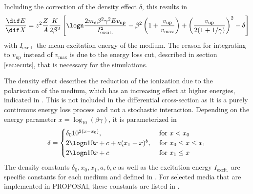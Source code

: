 Including the correction of the density effect $\delta$, this results in
\begin{align}
\frac{\dif E}{\dif X} = z^2 \frac{Z}{A} \frac{K}{2\beta^2}
    \left[
        \logn \frac{2 m_e \beta^2 \gamma^2 Ev_{\text{up}}}{I_{\text{excit.}}^2}
        - \beta^2 \left( 1 + \frac{v_{\text{up}}}{v_{\text{max}}} \right)
        + \left( \frac{v_\text{up}}{2(1 + 1/\gamma)} \right)^2
        - \delta
    \right]
\end{align}
with $I_{\text{excit.}}$ the mean excitation energy of the medium.
The reason for integrating to $v_{\text{up}}$ instead of $v_{\text{max}}$ is due to the energy loss cut, described in section \ref{sec:ecuts}, that is necessary for the simulations.

The density effect describes the reduction of the ionization due to the polarisation of the medium, which has an increasing effect at higher energies, indicated in .
This is not included in the differential cross-section as it is a purely continuous energy loss process and not a stochastic interaction.
Depending on the energy parameter $x = \log_{10}(\beta\gamma)$, it is parameterized in \cite{Sternheimer52}
\begin{align}
\delta =
    \begin{cases}
        \delta_0 10^{2(x - x_0)}, & \text{ for } x < x_0\\
        2 \logn 10 x + c + a(x_1 - x)^b, & \text{ for } x_0 \leq x \leq x_1 \\
        2 \logn 10 x + c & \text{ for } x_1 \leq x
    \end{cases}
\end{align}
The density constants $\delta_0, x_0, x_1, a, b, c$ as well as the excitation energy $I_{\text{excit.}}$ are specific constants for each medium and defined in \cite{Groom01}.
For selected media that are implemented in PROPOSAl, these constants are listed in .
